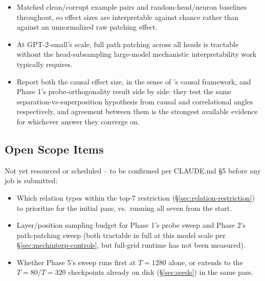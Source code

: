 \documentclass[11pt]{article}
\begin{document}
\begin{itemize}
  \item Matched clean/corrupt example pairs and random-head/neuron baselines
    throughout, so effect sizes are interpretable against chance rather than
    against an unnormalized raw patching effect.
  \item At GPT-2-small's scale, full path patching across all heads is
    tractable without the head-subsampling large-model mechanistic
    interpretability work typically requires.
  \item Report both the causal effect size, in the sense of
    \citet{elazar2022measuring}'s causal framework, and Phase 1's
    probe-orthogonality result side by side: they test the same
    separation-vs-superposition hypothesis from causal and correlational
    angles respectively, and agreement between them is the strongest
    available evidence for whichever answer they converge on.
\end{itemize}

\subsection{Open Scope Items}
\label{sec:mechinterp-module}

Not yet resourced or scheduled -- to be confirmed per CLAUDE.md \S5 before
any job is submitted:
\begin{itemize}
  \item Which relation types within the top-7 restriction
    (\S\ref{sec:relation-restriction}) to prioritize for the initial pass,
    vs.\ running all seven from the start.
  \item Layer/position sampling budget for Phase 1's probe sweep and Phase
    2's path-patching sweep (both tractable in full at this model scale per
    \S\ref{sec:mechinterp-controls}, but full-grid runtime has not been
    measured).
  \item Whether Phase 5's sweep runs first at $T{=}1280$ alone, or extends
    to the $T{=}80$/$T{=}320$ checkpoints already on disk
    (\S\ref{sec:seeds}) in the same pass.
\end{itemize}



\end{document}
